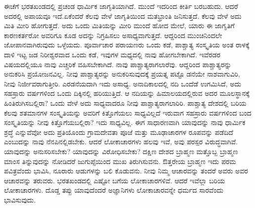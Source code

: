 ಈಚೆಗೆ ಭರತಖಂಡದಲ್ಲಿ ಪ್ರಚಂಡ ಧಾರ್ಮಿಕ ಜಾಗೃತಿಯಾಗಿದೆ. ಮುಂದೆ ಇದರಿಂದ ಕೀರ್ತಿ ಬರಬಹುದು. ಆದರೆ ಅದರಲ್ಲಿ ಅಪಾಯವೂ ಇದೆ.\break ಏಕೆಂದರೆ ಕೆಲವು ವೇಳೆ ಜಾಗೃತಿಯಿಂದ ಮತಭ್ರಾಂತಿ ಜನಿಸುತ್ತದೆ. ಕೆಲವು ವೇಳೆ ಅದು ಮಿತಿ ಮೀರಿ ಹೋಗುತ್ತದೆ. ಅದು ಒಂದು ಮಿತಿಯನ್ನು ಮೀರಿ ಮುಂದೆ ಹೋದ ಮೇಲೆ, ಯಾರು ಈ ಜಾಗೃತಿಗೆ ಕಾರಣಕರ್ತರೋ ಅವರಿಗೂ ಕೂಡ ಅದನ್ನು ನಿಗ್ರಹಿಸಲು ಅಸಾಧ್ಯವಾಗುತ್ತದೆ. ಆದ್ದರಿಂದ ಮುಂಚಿನಿಂದಲೇ ಜೋಪಾನವಾಗಿರುವುದು ಒಳ್ಳೆಯದು. ಪೂರ್ವಾಚಾರ ಪರಾಯಣರು ಒಂದು ಕಡೆ, ಪಾಶ್ಚಾತ್ಯ ಸಂಸ್ಕೃತಿಯ ಅಂತ ರಾಳಕ್ಕೆ ದಾಳಿ ಇಟ್ಟ ಜಡ ನಿರೀಶ್ವರವಾದ ಒಂದು ಕಡೆ, ಇವುಗಳ ಮಧ್ಯದಲ್ಲಿ ನಾವು ಹೋಗಬೇಕಾಗಿದೆ. ಇವೆರಡರ ವಿಷಯದಲ್ಲಿಯೂ ನಾವು ಎಚ್ಚರಿಕೆ ವಹಿಸಬೇಕಾಗಿದೆ. ನಾವು ಪಾಶ್ಚಾತ್ಯರಾಗಲಾರೆವು. ಆದ್ದರಿಂದ ಪಾಶ್ಚಾತ್ಯರನ್ನು ಅನುಕರಿಸಿ ಪ್ರಯೋಜನವಿಲ್ಲ. ನೀವು ಪಾಶ್ಚಾತ್ಯರನ್ನು ಅನುಕರಿಸುವುದಕ್ಕೆ ಪ್ರಯತ್ನ ಪಟ್ಟೊ ಡನೆಯೇ ನಾಶವಾಗುವಿರಿ, ನೀವು ನಿರ್ಜೀವರಾಗುತ್ತೀರಿ. ಎರಡನೆ\-ಯದಾಗಿ ಇದು ಅಸಾಧ್ಯ. ಅನಾದಿಕಾಲದಲ್ಲಿ ನದಿ ಒಂದೆಡೆ ಉಗಮಿಸಿದೆ, ಅದು ಸಹಸ್ರಾರು ವರ್ಷಗಳಿಂದ ಒಂದು ದಿಕ್ಕಿನಲ್ಲಿ ಹರಿಯುತ್ತಿದೆ. ಆ ನದಿಯನ್ನು ಹಿಮಾಲಯದಲ್ಲಿರುವ ಅದರ ಮೂಲಸ್ಥಾನಕ್ಕೆ ಹಿಂತಿರುಗಿಸಬಲ್ಲಿರಾ? ಒಂದು ವೇಳೆ ಅದು ಸಾಧ್ಯವಾದರೂ ನೀವು ಪಾಶ್ಚಾತ್ಯರಾಗಲಾರಿರಿ. ಪಾಶ್ಚಾತ್ಯ ದೇಶದಲ್ಲಿ ಬರಿಯ ಕೆಲವು ಶತಮಾನಗಳ ಸಂಸ್ಕೃತಿಯನ್ನು ಅವರಿಗೆ ಕಿತ್ತೊಗೆಯಲು ಸಾಧ್ಯವಿಲ್ಲದೆ ಇರುವಾಗ ಸಹಸ್ರಾರು ವರ್ಷಗಳಿಂದ ಬಂದ ಸಂಸ್ಕೃತಿಯನ್ನು ನೀವು ಕಿತ್ತೊಗೆಯಬಲ್ಲಿರಾ? ಇದು ಸಾಧ್ಯವಿಲ್ಲ. ಈಗ ಸಾಧಾರಣವಾಗಿ ಯಾವುದನ್ನು ನಾವು ಧಾರ್ಮಿಕ ಶ್ರದ್ಧೆ ಎನ್ನುವೆವೋ ಅದು ಪ್ರತಿಯೊಂದು ಗ್ರಾಮದೇವತಾ ಪೂಜೆ ಮತ್ತು ಮೂಢಾಚಾರಗಳ ರೂಪವನ್ನು ಪಡೆದಿದೆ ಎಂಬುದನ್ನು ನಾವು ನೆನಪಿನಲ್ಲಿಡಬೇಕು. ಆದರೆ ಲೋಕಾಚಾರಗಳು ಹಲವು ಇವೆ, ಅವು ಪರಸ್ಪರ ವಿರುದ್ಧವಾಗಿವೆ. ಯಾವುದನ್ನು ಅನುಸರಿಸ\-ಬೇಕು? ಯಾವುದನ್ನು ವಿರೋಧಿಸಬೇಕು? ದಕ್ಷಿಣ ದೇಶದ ಬ್ರಾಹ್ಮಣ ಮತ್ತೊಬ್ಬ ಬ್ರಾಹ್ಮಣ ಮಾಂಸ ತಿನ್ನುವುದನ್ನು ನೋಡಿದರೆ ಜುಗುಪ್ಸೆಯಿಂದ ಮುಖ ತಿರುಗಿಸುವನು. ಔತ್ತರೇಯ ಬ್ರಾಹ್ಮಣ ಇದು ಪರಮ ಪವಿತ್ರವೆಂದು ಭಾವಿಸಿ, ನೂರಾರು ಆಡುಗಳನ್ನು ಬಲಿ ಕೊಡುವನು. ನೀವು ನಿಮ್ಮ ಆಚಾರವನ್ನು ತಂದರೆ ಅವರು ಅವರ ಆಚಾರವನ್ನು ತರುವರು. ಭರತಖಂಡದಲ್ಲಿ ಎಷ್ಟೋ ಬಗೆಯ ಲೋಕಾಚಾರಗಳಿವೆ. ಆದರೆ ಇವೆಲ್ಲಾ ಬರಿಯ ಲೋಕಾಚಾರಗಳು. ದೊಡ್ಡ ತಪ್ಪು ಯಾವುದೆಂದರೆ ಅಜ್ಞಾನಿಗಳು ಲೋಕಾಚಾರವನ್ನೇ ಧರ್ಮದ ಸಾರವೆಂದು ಭಾವಿಸುವುದು. 

